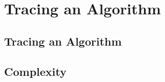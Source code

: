 \documentclass[../maths.tex]{subfiles}
\begin{document}
\chapter{Tracing an Algorithm}
\section{Tracing an Algorithm}
\section{Complexity}
\end{document}
